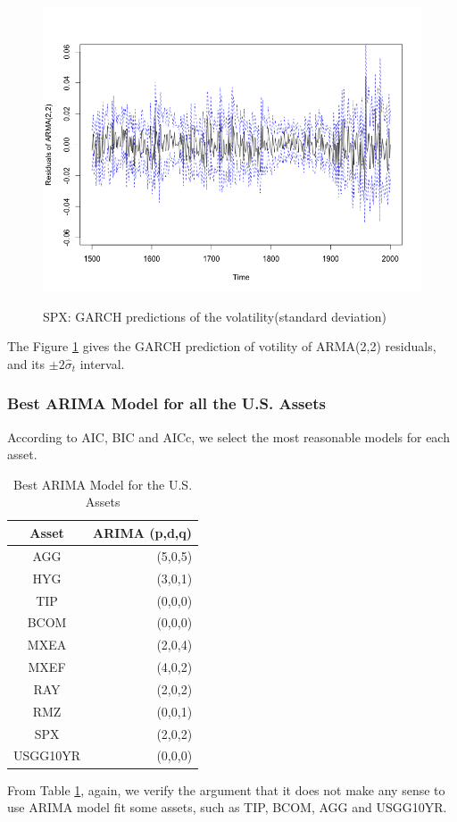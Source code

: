 \documentclass[12pt]{article}
\begin{document}
\begin{figure}
  \caption{SPX: GARCH predictions of the volatility(standard deviation)}
  \includegraphics[width = \textwidth]{../results/SPX_GARCH_predresid}
  \label{fig:SPX_GARCH_predresid}
\end{figure}
The Figure \ref{fig:SPX_GARCH_predresid} gives the GARCH prediction of votility of ARMA(2,2) residuals, and its $\pm 2\hat{\sigma}_t$ interval.

\subsubsection{Best ARIMA Model for all the U.S. Assets }
According to AIC, BIC and AICc, we select the most reasonable models for each asset.
\begin{table}[!h]
\caption{Best ARIMA Model for the U.S. Assets }
\centering 
\begin{tabular}{ | c || r | } 
 \hline
Asset & ARIMA (p,d,q) \\
  \hline \hline
AGG & (5,0,5) \\ 
HYG & (3,0,1) \\ 
TIP &  (0,0,0)\\ 
BCOM & (0,0,0)\\ 
MXEA & (2,0,4) \\ 
MXEF & (4,0,2)\\ 
RAY &  (2,0,2)\\ 
RMZ & (0,0,1) \\ 
SPX & (2,0,2) \\ 
USGG10YR & (0,0,0) \\
 \hline
\end{tabular}
\label{table:BestArima}
\end{table}
From Table \ref{table:BestArima}, again, we verify the argument that it does not make any sense to use ARIMA model fit some assets, such as TIP, BCOM, AGG and USGG10YR.
\end{document}
